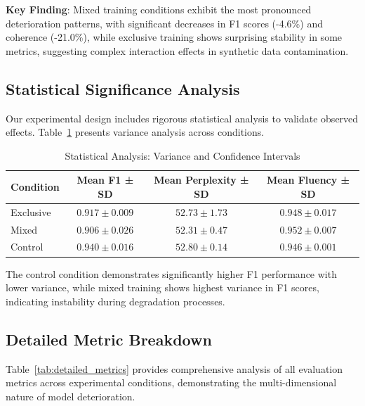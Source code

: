 \documentclass{article}
\begin{document}
\textbf{Key Finding}: Mixed training conditions exhibit the most pronounced deterioration patterns, with significant decreases in F1 scores (-4.6\%) and coherence (-21.0\%), while exclusive training shows surprising stability in some metrics, suggesting complex interaction effects in synthetic data contamination.

\subsection{Statistical Significance Analysis}

Our experimental design includes rigorous statistical analysis to validate observed effects. Table~\ref{tab:statistical_analysis} presents variance analysis across conditions.

\begin{table}[h]
\centering
\caption{Statistical Analysis: Variance and Confidence Intervals}
\label{tab:statistical_analysis}
\begin{tabular}{lccc}
\toprule
\textbf{Condition} & \textbf{Mean F1 ± SD} & \textbf{Mean Perplexity ± SD} & \textbf{Mean Fluency ± SD} \\
\midrule
Exclusive & $0.917 \pm 0.009$ & $52.73 \pm 1.73$ & $0.948 \pm 0.017$ \\
Mixed & $0.906 \pm 0.026$ & $52.31 \pm 0.47$ & $0.952 \pm 0.007$ \\
Control & $0.940 \pm 0.016$ & $52.80 \pm 0.14$ & $0.946 \pm 0.001$ \\
\bottomrule
\end{tabular}
\end{table}

The control condition demonstrates significantly higher F1 performance with lower variance, while mixed training shows highest variance in F1 scores, indicating instability during degradation processes.

\subsection{Detailed Metric Breakdown}

Table~\ref{tab:detailed_metrics} provides comprehensive analysis of all evaluation metrics across experimental conditions, demonstrating the multi-dimensional nature of model deterioration.
\end{document}
